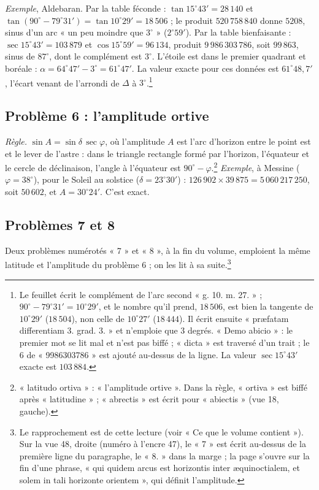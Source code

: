 \documentclass[11pt,a4paper]{article}
\begin{document}
\emph{Exemple}, Aldebaran. Par la table féconde : $\tan 15^\circ 43' = 28\,140$
et $\tan(90^\circ - 79^\circ 31') = \tan 10^\circ 29' = 18\,506$ ; le produit
$520\,758\,840$ donne $5208$, sinus d'un arc « un peu moindre que $3^\circ$ »
($2^\circ 59'$). Par la table bienfaisante : $\sec 15^\circ 43' = 103\,879$ et
$\cos 15^\circ 59' = 96\,134$, produit $9\,986\,303\,786$, soit $99\,863$, sinus de
$87^\circ$, dont le complément est $3^\circ$. L'étoile est dans le premier quadrant
et boréale : $\alpha = 64^\circ 47' - 3^\circ = 61^\circ 47'$. La valeur exacte pour
ces données est $61^\circ 48{,}7'$, l'écart venant de l'arrondi de $\Delta$ à
$3^\circ$.\footnote{Le feuillet écrit le complément de l'arc second « g. 10. m.
27. » ; $90^\circ - 79^\circ 31' = 10^\circ 29'$, et le nombre qu'il prend,
$18\,506$, est bien la tangente de $10^\circ 29'$ ($18\,504$), non celle de
$10^\circ 27'$ ($18\,444$). Il écrit ensuite « præfatam differentiam 3. grad. 3. »
et n'emploie que 3 degrés. « Demo abicio » : le premier mot se lit mal et n'est
pas biffé ; « dicta » est traversé d'un trait ; le 6 de « 9986303786 » est ajouté
au-dessus de la ligne. La valeur $\sec 15^\circ 43'$ exacte est $103\,884$.}

\subsection*{Problème 6 : l'amplitude ortive}

\emph{Règle.} $\sin A = \sin\delta\,\sec\varphi$, où l'amplitude $A$ est l'arc
d'horizon entre le point est et le lever de l'astre : dans le triangle rectangle
formé par l'horizon, l'équateur et le cercle de déclinaison, l'angle à l'équateur
est $90^\circ - \varphi$.\footnote{« latitudo ortiva » : « l'amplitude ortive ».
Dans la règle, « ortiva » est biffé après « latitudine » ; « abrectis » est écrit
pour « abiectis » (vue 18, gauche).} \emph{Exemple}, à Messine
($\varphi = 38^\circ$), pour le Soleil au solstice ($\delta = 23^\circ 30'$) :
$126\,902 \times 39\,875 = 5\,060\,217\,250$, soit $50\,602$, et
$A = 30^\circ 24'$. C'est exact.

\subsection*{Problèmes 7 et 8}

Deux problèmes numérotés « 7 » et « 8 », à la fin du volume, emploient la même
latitude et l'amplitude du problème 6 ; on les lit à sa suite.\footnote{Le
rapprochement est de cette lecture (voir « Ce que le volume contient »). Sur la
vue 48, droite (numéro à l'encre 47), le « 7 » est écrit au-dessus de la
première ligne du paragraphe, le « 8. » dans la marge ; la page s'ouvre sur la
fin d'une phrase, « qui quidem arcus est horizontis inter æquinoctialem, et
solem in tali horizonte orientem », qui définit l'amplitude.}
\end{document}
